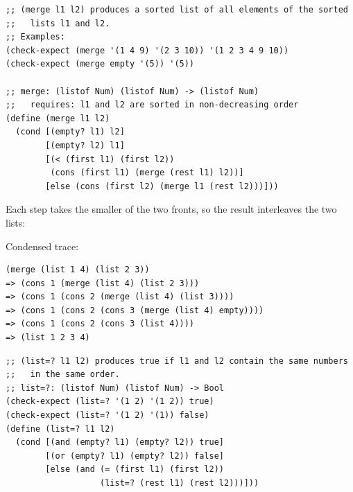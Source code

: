\begin{example}
\begin{lstlisting}[style=racket]
;; (merge l1 l2) produces a sorted list of all elements of the sorted
;;   lists l1 and l2.
;; Examples:
(check-expect (merge '(1 4 9) '(2 3 10)) '(1 2 3 4 9 10))
(check-expect (merge empty '(5)) '(5))

;; merge: (listof Num) (listof Num) -> (listof Num)
;;   requires: l1 and l2 are sorted in non-decreasing order
(define (merge l1 l2)
  (cond [(empty? l1) l2]
        [(empty? l2) l1]
        [(< (first l1) (first l2))
         (cons (first l1) (merge (rest l1) l2))]
        [else (cons (first l2) (merge l1 (rest l2)))]))
\end{lstlisting}
Each step takes the smaller of the two fronts, so the result interleaves the
two lists:

\begin{center}
\end{center}

Condensed trace:
\begin{lstlisting}[style=racket]
(merge (list 1 4) (list 2 3))
=> (cons 1 (merge (list 4) (list 2 3)))
=> (cons 1 (cons 2 (merge (list 4) (list 3))))
=> (cons 1 (cons 2 (cons 3 (merge (list 4) empty))))
=> (cons 1 (cons 2 (cons 3 (list 4))))
=> (list 1 2 3 4)
\end{lstlisting}
\end{example}

\begin{example}
\begin{lstlisting}[style=racket]
;; (list=? l1 l2) produces true if l1 and l2 contain the same numbers
;;   in the same order.
;; list=?: (listof Num) (listof Num) -> Bool
(check-expect (list=? '(1 2) '(1 2)) true)
(check-expect (list=? '(1 2) '(1)) false)
(define (list=? l1 l2)
  (cond [(and (empty? l1) (empty? l2)) true]
        [(or (empty? l1) (empty? l2)) false]
        [else (and (= (first l1) (first l2))
                   (list=? (rest l1) (rest l2)))]))
\end{lstlisting}
\end{example}

